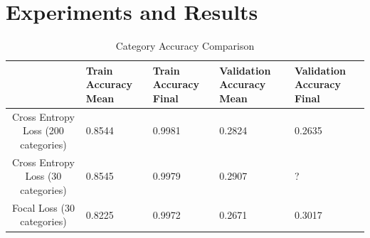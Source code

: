 \documentclass[10pt,twocolumn,letterpaper]{article}
\begin{document}
\section{Experiments and Results}
\begin{table}
\begin{center}
\begin{tabular}{|c|l|l|l|l|}
\hline
 & Train Accuracy Mean & Train Accuracy Final & Validation Accuracy Mean & Validation Accuracy Final \\
\hline\hline
Cross Entropy Loss (200 categories) & 0.8544 & 0.9981 & 0.2824 & 0.2635 \\
Cross Entropy Loss (30 categories) & 0.8545 & 0.9979 & 0.2907 & ? \\
Focal Loss (30 categories) & 0.8225 & 0.9972 & 0.2671 & 0.3017 \\
\hline
\end{tabular}
\end{center}
\caption{Category Accuracy Comparison}
\label{tab:accuracy}
\end{table}
\end{document}
